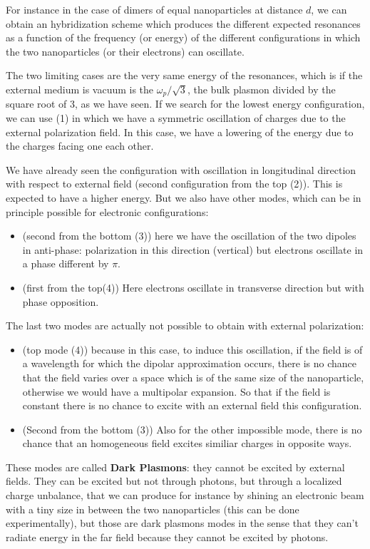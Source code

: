 \documentclass[../main/main.tex]{subfiles}
\begin{document}
For instance in the case of dimers of equal nanoparticles at distance $d$, we can obtain an hybridization scheme which produces the different expected resonances as a function of the frequency (or energy) of the different configurations in which the two nanoparticles (or their electrons) can oscillate.

The two limiting cases are the very same energy of the resonances, which is if the external medium is vacuum is the $\omega_{p}/\sqrt{3}$, the bulk plasmon divided by the square root of 3, as we have seen.
If we search for the lowest energy configuration, we can use (1) in which we have a symmetric oscillation of charges due to the external polarization field. In this case, we have a lowering of the energy due to the charges facing one each other.

We have already seen the configuration with oscillation in longitudinal direction with respect to external field (second configuration from the top (2)). This is expected to have a higher energy.
But we also have other modes, which can be in principle possible for electronic configurations:
\begin{itemize}
\item (second from the bottom (3)) here we have the oscillation of the two dipoles in anti-phase: polarization in this direction (vertical) but electrons oscillate in a phase different by $\pi$.
\item (first from the top(4)) Here electrons oscillate in transverse direction but with phase opposition.
\end{itemize}
The last two modes are actually not possible to obtain with external polarization:
\begin{itemize}
\item (top mode (4)) because in this case, to induce this oscillation,  if the field is of a wavelength for which the dipolar approximation occurs, there is no chance that the field varies over a space which is of the same size of the nanoparticle, otherwise we would have a multipolar expansion. So that if the field is constant there is no chance to excite with an external field this configuration.
\item (Second from the bottom (3)) Also for the other impossible mode, there is no chance that an homogeneous field excites similiar charges in opposite ways.
\end{itemize}
These modes are called \textbf{Dark Plasmons}: they cannot be excited by external fields. They can be excited but not through photons, but through a localized charge unbalance, that we can produce for instance by shining an electronic beam with a tiny size in between the two nanoparticles (this can be done experimentally), but those are dark plasmons modes in the sense that they can't radiate energy in the far field because they cannot be excited by photons.
\end{document}
